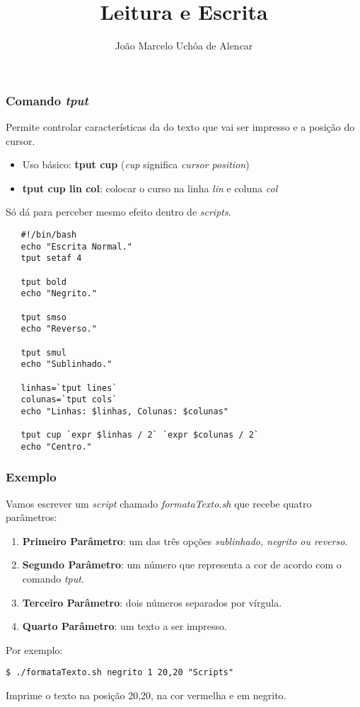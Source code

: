 \documentclass{beamer}
\title{Leitura e Escrita}
\author[João Marcelo Uchôa de Alencar]{João Marcelo Uchôa de Alencar}
\institute{Universidade Federal do Ceará - Quixadá}
\begin{document}
   \begin{frame}
      \titlepage
   \end{frame}

   \begin{frame}
      \frametitle{Comando \textit{tput}}
      Permite controlar características da do texto que vai ser impresso e a posição do cursor. \\
      \begin{itemize}
         \item Uso básico: \textbf{tput cup} (\textit{cup} significa \textit{cursor position})
	      \item \textbf{tput cup lin col}: colocar o curso na linha \textit{lin} e coluna \textit{col}
      \end{itemize}
      Só dá para perceber mesmo efeito dentro de \textit{scripts}.
   \end{frame}

   \begin{frame}[fragile]
   \begin{verbatim}
   #!/bin/bash
   echo "Escrita Normal."
   tput setaf 4

   tput bold
   echo "Negrito."

   tput smso
   echo "Reverso."

   tput smul
   echo "Sublinhado."

   linhas=`tput lines`
   colunas=`tput cols`
   echo "Linhas: $linhas, Colunas: $colunas"

   tput cup `expr $linhas / 2` `expr $colunas / 2`
   echo "Centro."
   \end{verbatim}
\end{frame}

   \begin{frame}[fragile]
      \frametitle{Exemplo}
      Vamos escrever um \textit{script} chamado \textit{formataTexto.sh} que recebe quatro parâmetros: 
      \begin{enumerate} 	     
         \item \textbf{Primeiro Parâmetro}: um das três opções \textit{sublinhado, negrito ou reverso}. 
         \item \textbf{Segundo Parâmetro}: um número que representa a cor de acordo com o comando \textit{tput}. 
         \item \textbf{Terceiro Parâmetro}: dois números separados por vírgula. 
         \item \textbf{Quarto Parâmetro}: um texto a ser impresso. 
      \end{enumerate}
      Por exemplo: 
      \begin{verbatim}
$ ./formataTexto.sh negrito 1 20,20 "Scripts"
      \end{verbatim}
      Imprime o texto na posição 20,20, na cor vermelha e em negrito.
\end{frame}
\end{document}
